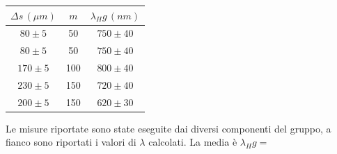 \documentclass[10pt,a4paper]{article}
\begin{document}
\begin{table}[!htb]
\centering
\begin{tabular}{|c|c|c|}
\hline 
$\Delta s \, (\mu m)$ & $m$ & $\lambda_Hg \, (nm) $\\ 
\hline 
$80 \pm 5$  & 50 & $750 \pm 40$\\ 
\hline 
$80 \pm 5$  & 50 & $750 \pm 40$\\ 
\hline 
$170 \pm 5$  & 100 & $800 \pm 40$\\ 
\hline 
$230 \pm 5$  & 150 & $720 \pm 40$\\ 
\hline 
$200 \pm 5$  & 150 & $620 \pm 30$\\ 
\hline 
\end{tabular} 
\end{table}


Le misure riportate sono state eseguite dai diversi componenti del gruppo, a fianco sono riportati i valori di $\lambda$ calcolati. La media è $\lambda_Hg = $

\end{document}
